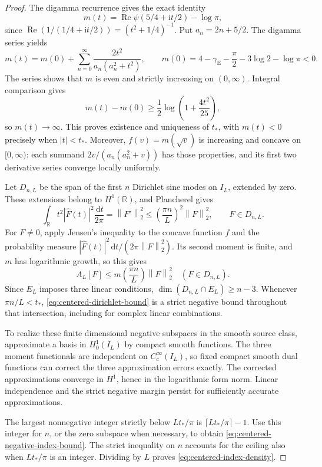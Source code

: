 \documentclass[11pt]{article}
\numberwithin{equation}{section}
\theoremstyle{definition}
\theoremstyle{remark}
\newcommand{\Rea}{\operatorname{Re}}
\newcommand{\ii}{\mathrm i}
\newcommand{\norm}[1]{\left\lVert #1\right\rVert}
\newcommand{\dd}{\,\mathrm d}
\begin{document}
\begin{proof}
The digamma recurrence gives the exact identity
\begin{equation}\label{eq:centered-shifted-digamma}
 m(t)=\Rea\psi(5/4+\ii t/2)-\log\pi,
\end{equation}
since
\(\Rea(1/(1/4+\ii t/2))=(t^2+1/4)^{-1}\).
Put \(a_n=2n+5/2\).  The digamma series yields
\begin{equation}\label{eq:centered-m-series}
 m(t)=m(0)+\sum_{n=0}^\infty
          \frac{2t^2}{a_n(a_n^2+t^2)},\qquad
 m(0)=4-\gamma_{\mathrm E}-\frac{\pi}{2}-3\log2-\log\pi<0.
\end{equation}
The series shows that \(m\) is even and strictly increasing on
\((0,\infty)\).  Integral comparison gives
\[
 m(t)-m(0)\geq\frac12\log\left(1+\frac{4t^2}{25}\right),
\]
so \(m(t)\to\infty\).  This proves existence and uniqueness of \(t_*\),
with \(m(t)<0\) precisely when \(|t|<t_*\).
Moreover, \(f(v)=m(\sqrt v)\) is increasing and concave on \([0,\infty)\):
each summand \(2v/(a_n(a_n^2+v))\) has those properties, and its first two
derivative series converge locally uniformly.

Let \(D_{n,L}\) be the span of the first \(n\) Dirichlet sine modes on
\(I_L\), extended by zero.  These extensions belong to \(H^1(\mathbb R)\),
and Plancherel gives
\[
 \int_{\mathbb R}t^2|\widehat F(t)|^2\frac{\dd t}{2\pi}
 =\norm{F'}_2^2
 \leq\left(\frac{\pi n}{L}\right)^2\norm F_2^2,
 \qquad F\in D_{n,L}.
\]
For \(F\ne0\), apply Jensen's inequality to the concave function \(f\)
and the probability measure
\(|\widehat F(t)|^2\dd t/(2\pi\norm F_2^2)\).  Its second moment is
finite, and \(m\) has logarithmic growth, so this gives
\begin{equation}\label{eq:centered-dirichlet-bound}
 A_L[F]\leq m\!\left(\frac{\pi n}{L}\right)\norm F_2^2
 \quad(F\in D_{n,L}).
\end{equation}
Since \(E_L\) imposes three linear conditions,
\(\dim(D_{n,L}\cap E_L)\geq n-3\).  Whenever \(\pi n/L<t_*\),
\eqref{eq:centered-dirichlet-bound} is a strict negative bound throughout
that intersection, including for complex linear combinations.

To realize these finite dimensional negative subspaces in the smooth
source class, approximate a basis in \(H^1_0(I_L)\) by compact smooth
functions.  The three moment functionals are independent on
\(C_c^\infty(I_L)\), so fixed compact smooth dual functions can correct
the three approximation errors exactly.  The corrected approximations
converge in \(H^1\), hence in the logarithmic form norm.  Linear
independence and the strict negative margin persist for sufficiently
accurate approximations.

The largest nonnegative integer strictly below \(Lt_*/\pi\) is
\(\lceil Lt_*/\pi\rceil-1\).  Use this integer for \(n\), or the zero
subspace when necessary, to obtain
\eqref{eq:centered-negative-index-bound}.  The strict inequality on
\(n\) accounts for the ceiling also when \(Lt_*/\pi\) is an integer.
Dividing by \(L\) proves \eqref{eq:centered-index-density}.
\end{proof}
\end{document}
